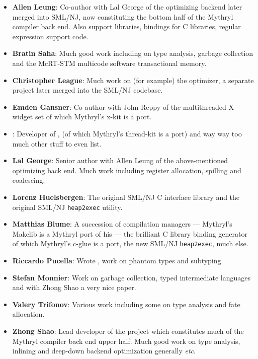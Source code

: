 \begin{itemize}
\item {\bf Allen Leung}:  Co-author with Lal George of the  optimizing backend later merged into SML/NJ, now constituting the bottom half of the Mythryl compiler back end.  Also support libraries, bindings for C libraries, regular expression support code.
\item {\bf Bratin Saha}:  Much good work including on type analysis, garbage collection and the McRT-STM multicode software transactional memory. 
\item {\bf Christopher League}:  Much work on (for example) the  optimizer, a separate project later merged into the SML/NJ codebase.
\item {\bf Emden Gansner}:  Co-author with John Reppy of the  multithreaded X widget set of which Mythryl's x-kit is a port.
\item {}:  Developer of ,  (of which Mythryl's thread-kit is a port)  and way way too much other stuff to even list.
\item {\bf Lal George}:  Senior author with Allen Leung of the above-mentioned  optimizing back end.  Much work including register allocation, spilling and coalescing.
\item {\bf Lorenz Huelsbergen}:  The original SML/NJ C interface library and the original SML/NJ {\tt heap2exec} utility.
\item {\bf Matthias Blume}:   A succession of compilation managers --- Mythryl's Makelib is a Mythryl port of his  --- the brilliant  C library binding generator of which Mythryl's c-glue is a port, the new {\sc SML/NJ} {\tt heap2exec}, much else.
\item {\bf Riccardo Pucella}:  Wrote , work on phantom types and subtyping.
\item {\bf Stefan Monnier}:  Work on garbage collection, typed intermediate languages and with Zhong Shao a very nice  paper.
\item {\bf Valery Trifonov}: Various work including some on type analysis and fate allocation.
\item {\bf Zhong Shao}:  Lead developer of the  project which constitutes much of the Mythryl compiler back end upper half.  Much good work on type analysis, inlining and deep-down backend optimization generally {\it etc}.
\end{itemize}

